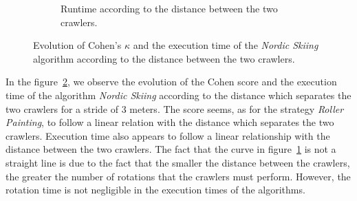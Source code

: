 \documentclass[english,RandD]{rapportPFE}  %
\begin{document}
\begin{figure}[h!]
\begin{subfigure}[t]{0.49\linewidth}
					\caption{Runtime according to the distance between the two crawlers.}
					\label{fig:ski_nordique-time_vs_distance}
				\end{subfigure}
				\caption{Evolution of Cohen's $\kappa$ and the execution time of the \textit{Nordic Skiing} algorithm according to the distance between the two crawlers.}
				\label{fig:ski_nordique-distance}
			\end{figure}

			In the figure~\ref{fig:ski_nordique-distance}, we observe the evolution of the Cohen score and the execution time of the algorithm \textit{Nordic Skiing} according to the distance which separates the two crawlers for a stride of 3 meters.
			The score seems, as for the strategy \textit{Roller Painting}, to follow a linear relation with the distance which separates the two crawlers.
			Execution time also appears to follow a linear relationship with the distance between the two crawlers.
			The fact that the curve in figure~\ref{fig:ski_nordique-time_vs_distance} is not a straight line is due to the fact that the smaller the distance between the crawlers, the greater the number of rotations that the crawlers must perform.
			However, the rotation time is not negligible in the execution times of the algorithms.
\end{document}
